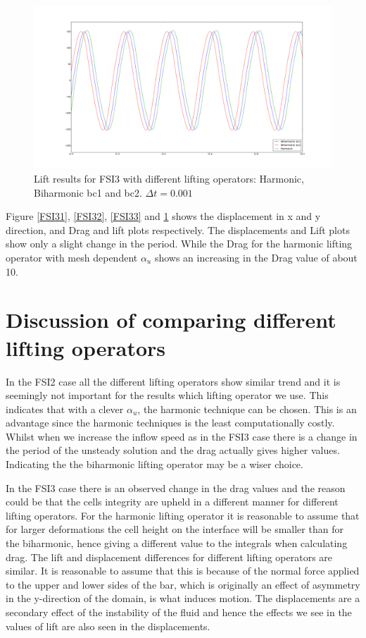 \begin{figure}[H]
    \label{FSI34}
    \centering
    \includegraphics[scale=0.20]{./Mesh_motion_results/FSI3_dt0001_Lift.png} 
    \caption{Lift results for FSI3 with different lifting operators: Harmonic, Biharmonic bc1 and bc2. $\Delta t = 0.001$}
\end{figure}

Figure \ref{FSI31}, \ref{FSI32}, \ref{FSI33} and \ref{FSI34} shows the displacement in x and y direction, and Drag and lift plots respectively. The displacements and Lift plots show only a slight change in the period. While the Drag for the harmonic lifting operator with mesh dependent $\alpha_u$ shows an increasing in the Drag value of about 10.

\section{Discussion of comparing different lifting operators}
In the FSI2 case all the different lifting operators show similar trend and it is seemingly not important for the results which lifting operator we use. This indicates that with a clever $\alpha_u$, the harmonic technique can be chosen. This is an advantage since the harmonic techniques is the least computationally costly. Whilst when we increase the inflow speed as in the FSI3 case there is a change in the period of the unsteady solution and the drag actually gives higher values. Indicating the the biharmonic lifting operator may be a wiser choice.

In the FSI3 case there is an observed change in the drag values and the reason could be that the cells integrity are upheld in a different manner for different lifting operators. For the harmonic lifting operator it is reasonable to assume that for larger deformations the cell height on the interface will be smaller than for the biharmonic, hence giving a different value to the integrals when calculating drag. The lift and displacement differences for different lifting operators are similar. It is reasonable to assume that this is because of the normal force applied to the upper and lower sides of the bar, which is originally an effect of asymmetry in the y-direction of the domain, is what induces motion. The displacements are a secondary effect of the instability of the fluid and hence the effects we see in the values of lift are also seen in the displacements.

